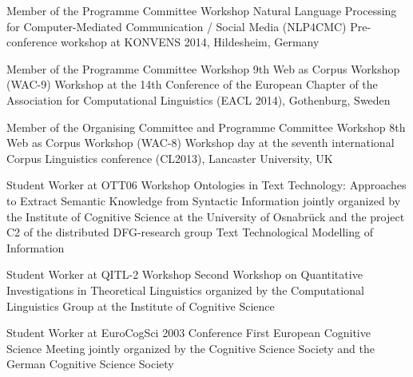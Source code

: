 
        {Member of the Programme Committee}
        {Workshop}
        {Natural Language Processing for Computer-Mediated Communication /
        Social Media (NLP4CMC)}
        {Pre-conference workshop at KONVENS 2014, Hildesheim, Germany}
        {}

        {Member of the Programme Committee}
        {Workshop}
        {9th Web as Corpus Workshop (WAC-9)}
        {Workshop at the 14th Conference of the European Chapter of the
        Association for Computational Linguistics (EACL 2014), Gothenburg,
        Sweden}
        {}

        {Member of the Organising Committee and Programme Committee}
        {Workshop}
        {8th Web as Corpus Workshop (WAC-8)}
        {Workshop day at the seventh international Corpus Linguistics
        conference (CL2013), Lancaster University, UK}
        {}

        {Student Worker at OTT06}
        {Workshop}
        {Ontologies in Text Technology: Approaches to Extract Semantic
        Knowledge from Syntactic Information}
        {jointly organized by the Institute of Cognitive Science at the
        University of Osnabr\"{u}ck and the project C2 of the distributed
        DFG-research group Text Technological Modelling of Information}
        {}

        {Student Worker at QITL-2}
        {Workshop}
        {Second Workshop on Quantitative Investigations in Theoretical
        Linguistics}
        {organized by the Computational Linguistics Group at the Institute of
        Cognitive Science}
        {}

        {Student Worker at EuroCogSci 2003}
        {Conference}
        {First European Cognitive Science Meeting}
        {jointly organized by the Cognitive Science Society and the German
        Cognitive Science Society}
        {}

